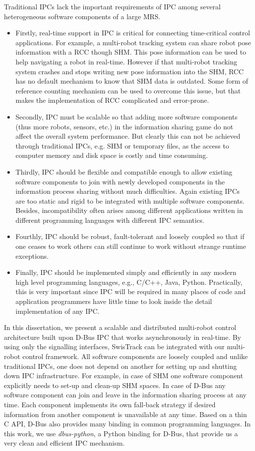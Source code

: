 Traditional IPCs lack the important requirements of IPC among several heterogeneous software components of a large MRS. 
\begin{itemize}
\item Firstly, real-time support in IPC is critical for connecting time-critical control applications. For example, a multi-robot tracking system  can share robot pose information with a \acf{RCC} though  \acf{SHM}. This pose information can be used to help navigating a robot in real-time. However if that multi-robot tracking system crashes and stops writing new pose information into the SHM, RCC has no default mechanism to know that SHM data is outdated. Some form of reference counting mechanism can be used to overcome this issue, but that makes the implementation of RCC complicated and error-prone.
%
\item Secondly, IPC must be scalable so that adding more software components (thus more robots, sensors, etc.) in the information sharing game do not affect the overall system performance. But clearly this can not be achieved through traditional IPCs, e.g. SHM or temporary files, as the access to computer memory and disk space is costly and time consuming.
%
\item Thirdly, IPC should be flexible and compatible enough to allow existing software components to join with newly developed components in the information process sharing without much difficulties. Again existing IPCs are too static and rigid to be integrated with multiple software components. Besides, incompatibility often arises among different applications written in different programming languages with different IPC semantics.
%
\item Fourthly, IPC should be robust, fault-tolerant and loosely coupled so that if one ceases to work others can still continue to work without strange runtime exceptions. 
%
\item Finally, IPC should be implemented simply and efficiently in any modern high level programming languages, e.g., C/C++, Java, Python. Practically, this is very important since IPC will be required in many places of code and application programmers have little time to look inside the detail implementation of any IPC.
\end{itemize}
%
In this dissertation, we present a scalable and distributed multi-robot control architecture built upon D-Bus IPC that works asynchronously in real-time. By using only the signalling interfaces, SwisTrack can be integrated with our multi-robot control framework. All software components are loosely coupled and unlike traditional IPCs, one does not depend on another for setting up and shutting down IPC infrastructure. For example, in case of SHM one software component explicitly needs to set-up and clean-up SHM spaces. In case of D-Bus any software component can join and leave in the information sharing process at any time. Each component implements its own fall-back strategy if desired information from another component is unavailable at any time. Based on a thin C API, D-Bus also provides many binding in common programming languages. In this work, we use {\em dbus-python}, a Python binding for D-Bus, that provide us a very clean and efficient IPC mechanism.
